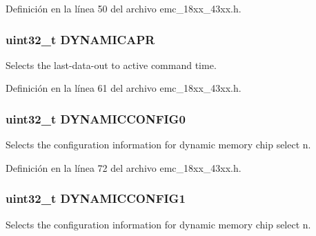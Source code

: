 Definición en la línea 50 del archivo emc\+\_\+18xx\+\_\+43xx.\+h.

\subsubsection[{\texorpdfstring{D\+Y\+N\+A\+M\+I\+C\+A\+PR}{DYNAMICAPR}}]{ uint32\+\_\+t D\+Y\+N\+A\+M\+I\+C\+A\+PR}\hypertarget{struct_l_p_c___e_m_c___t_af8b22d08afc9f00ad401b323ba5e208b}{}\label{struct_l_p_c___e_m_c___t_af8b22d08afc9f00ad401b323ba5e208b}
Selects the last-\/data-\/out to active command time. 

Definición en la línea 61 del archivo emc\+\_\+18xx\+\_\+43xx.\+h.

\subsubsection[{\texorpdfstring{D\+Y\+N\+A\+M\+I\+C\+C\+O\+N\+F\+I\+G0}{DYNAMICCONFIG0}}]{ uint32\+\_\+t D\+Y\+N\+A\+M\+I\+C\+C\+O\+N\+F\+I\+G0}\hypertarget{struct_l_p_c___e_m_c___t_a9e540e18b5d57f3668f2421689b52160}{}\label{struct_l_p_c___e_m_c___t_a9e540e18b5d57f3668f2421689b52160}
Selects the configuration information for dynamic memory chip select n. 

Definición en la línea 72 del archivo emc\+\_\+18xx\+\_\+43xx.\+h.

\subsubsection[{\texorpdfstring{D\+Y\+N\+A\+M\+I\+C\+C\+O\+N\+F\+I\+G1}{DYNAMICCONFIG1}}]{ uint32\+\_\+t D\+Y\+N\+A\+M\+I\+C\+C\+O\+N\+F\+I\+G1}\hypertarget{struct_l_p_c___e_m_c___t_a16f19ad62999ab8a705913370266f507}{}\label{struct_l_p_c___e_m_c___t_a16f19ad62999ab8a705913370266f507}
Selects the configuration information for dynamic memory chip select n. 

